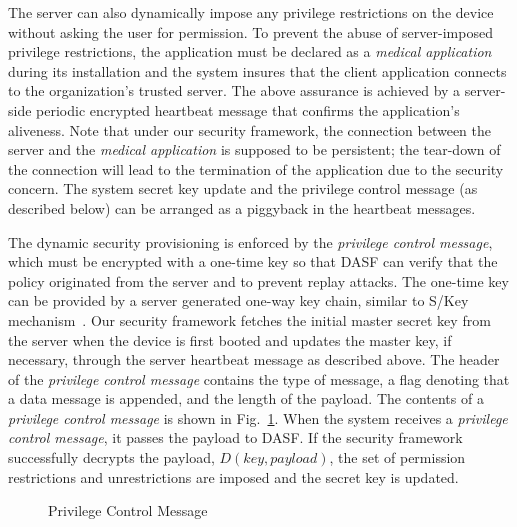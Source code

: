 The server can also dynamically impose any privilege restrictions on
the device without asking the user for permission.  To prevent the
abuse of server-imposed privilege restrictions, the application must
be declared as a \textit{medical application} during its installation
and the system insures that the client application connects to the
organization's trusted server. The above assurance is achieved by a
server-side periodic encrypted heartbeat message that confirms the
application's aliveness.  Note that under our security framework, the
connection between the server and the \textit{medical application} is
supposed to be persistent; the tear-down of the connection will lead
to the termination of the application due to the security concern. 
The system secret key update and the privilege control message
(as described below) can be arranged as a piggyback in the heartbeat 
messages.  

The dynamic security provisioning is enforced by the \textit{privilege
  control message}, which must be encrypted with a one-time key so
that DASF can verify that the policy originated from the server and to
prevent replay attacks. The one-time key can be provided by a server
generated one-way key chain, similar to S/Key mechanism~\cite{skey}. 
Our security framework fetches the initial master secret key from the
server when the device is first booted and updates the master key, if
necessary, through the server heartbeat message as described above. 
%
%
The header of the \textit{privilege control
 message} contains the type of message, a flag denoting that a data message
is appended, and the length of the payload. The contents of 
a \textit{privilege control message} is shown in
Fig.~\ref{fig:privilegemessage}.  When the system receives a
\textit{privilege control message}, it passes the payload to DASF.
If the security framework successfully decrypts
the payload, $D\left(key, payload\right)$, the set of permission restrictions
and unrestrictions are imposed and the secret key is updated.

\begin{figure}[ht]
\centering
{}
\caption{Privilege Control Message}
\label{fig:privilegemessage}
\end{figure}

